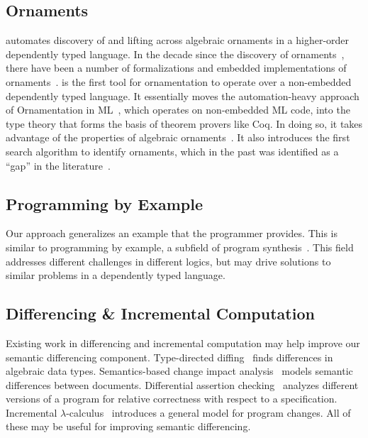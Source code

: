 \subsection*{Ornaments}


\toolnameb automates discovery of and lifting across algebraic ornaments in a higher-order dependently typed language.
In the decade since the discovery of ornaments~\cite{mcbride}, there have been a number
of formalizations and embedded implementations of ornaments~\cite{Dagand:2013:CTO:2591370.2591396, ko2013relational, dagand2014transporting, ko2016programming, dagand2017essence}.
\toolnameb is the first tool for ornamentation to operate over a non-embedded dependently typed language.
It essentially moves the automation-heavy approach of Ornamentation in ML~\cite{Williams2017},
which operates on non-embedded ML code, into the type theory that forms the basis of theorem provers like Coq. 
In doing so, it takes advantage of the properties of algebraic ornaments~\cite{mcbride}.
It also introduces the first search algorithm to identify ornaments, which in the past 
was identified as a ``gap'' in the literature~\cite{ko2016programming}.

\subsection*{Programming by Example}


Our approach generalizes an example that the programmer provides.
This is similar to programming by example, a subfield of 
program synthesis~\cite{DBLP:journals/ftpl/GulwaniPS17}. 
This field addresses different challenges in different logics,
but may drive solutions to similar problems in a dependently typed language.

\subsection*{Differencing \& Incremental Computation}


Existing work in differencing and incremental computation may help 
improve our semantic differencing component.
Type-directed diffing~\cite{Miraldo:2017:TDS:3122975.3122976}
finds differences in algebraic data types.
Semantics-based change impact analysis~\cite{Autexier:2010:SCI:1860559.1860580} models semantic differences
between documents.
Differential assertion checking~\cite{differential-assertion-checking-2} analyzes different
versions of a program for relative correctness with respect to a specification.
Incremental $\lambda$-calculus~\cite{Cai:2014:TCH:2594291.2594304} introduces a general model for program changes.
All of these may be useful for improving semantic differencing.

